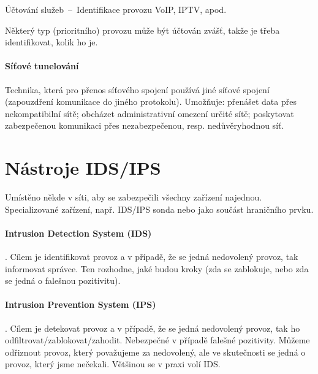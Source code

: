 \begin{compactitem}
\begin{compactitem}
        \item Účtování služeb~--~Identifikace provozu VoIP, IPTV, apod. \begin{compactitem}
            \item Některý typ (prioritního) provozu může být účtován zvášť, takže je třeba identifikovat, kolik ho je.
        \end{compactitem}
    \end{compactitem}
\end{compactitem}

\paragraph*{Síťové tunelování} Technika, která pro přenos síťového spojení používá jiné síťové spojení (zapouzdření komunikace do jiného protokolu). Umožňuje: přenášet data přes nekompatibilní sítě; obcházet administrativní omezení určité sítě; poskytovat zabezpečenou komunikaci přes nezabezpečenou, resp. nedůvěryhodnou síť.


\section{Nástroje IDS/IPS}

Umístěno někde v síti, aby se zabezpečili všechny zařízení najednou. Specializované zařízení, např. IDS/IPS sonda nebo jako součást hraničního prvku.

\paragraph*{Intrusion Detection System (IDS)} . Cílem je identifikovat provoz a v případě, že se jedná nedovolený provoz, tak informovat správce. Ten rozhodne, jaké budou kroky (zda se zablokuje, nebo zda se jedná o falešnou pozitivitu).

\paragraph*{Intrusion Prevention System (IPS)} . Cílem je detekovat provoz a v případě, že se jedná nedovolený provoz, tak ho odfiltrovat/zablokovat/zahodit. Nebezpečné v případě falešné pozitivity. Můžeme odřiznout provoz, který považujeme za nedovolený, ale ve skutečnosti se jedná o provoz, který jsme nečekali. Většinou se v praxi volí IDS.

